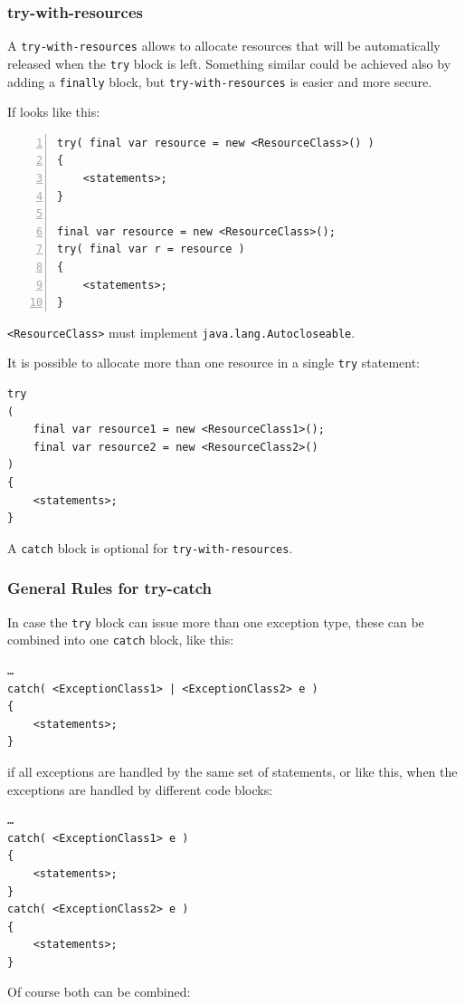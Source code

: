 \documentclass[12pt,a4paper,titlepage, parskip=half, headsepline, footsepline, cleardoubleplain]{scrbook}
\begin{document}
\subsubsection{try-with-resources}
A \lstinline|try-with-resources| allows to allocate resources that will be automatically released when the \lstinline|try| block is left. Something similar could be achieved also by adding a \lstinline|finally| block, but \lstinline|try-with-resources| is easier and more secure.

If looks like this:

\begin{lstlisting}[numbers=left]
try( final var resource = new <ResourceClass>() )
{
    <statements>;
}

final var resource = new <ResourceClass>();
try( final var r = resource )
{
    <statements>;
}
\end{lstlisting}

\lstinline|<ResourceClass>| must implement \lstinline|java.lang.Autocloseable|.

It is possible to allocate more than one resource in a single \lstinline|try| statement:
\begin{lstlisting}
try
( 
    final var resource1 = new <ResourceClass1>(); 
    final var resource2 = new <ResourceClass2>() 
)
{
    <statements>;
}
\end{lstlisting}

A \lstinline|catch| block is optional for \lstinline|try-with-resources|.

\subsubsection{General Rules for try-catch}
In case the \lstinline|try| block can issue more than one exception type, these can be combined into one \lstinline|catch| block, like this:
\begin{lstlisting}
…
catch( <ExceptionClass1> | <ExceptionClass2> e )
{
    <statements>;
}
\end{lstlisting}

if all exceptions are handled by the same set of statements, or like this, when the exceptions are handled by different code blocks:

\begin{lstlisting}
…
catch( <ExceptionClass1> e )
{
    <statements>;
}
catch( <ExceptionClass2> e )
{
    <statements>;
}
\end{lstlisting}

Of course both can be combined:
\end{document}
